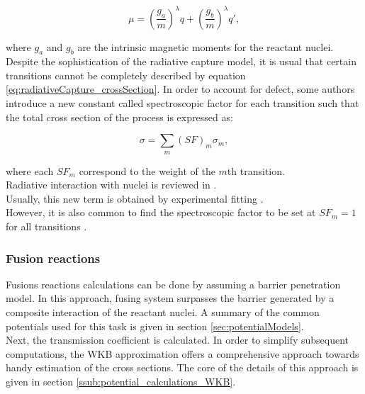 \documentclass[openany]{book}
\begin{document}
\begin{equation} \label{eq:radiativeCapture_Magnetic_moment}
	\mu =  \left(\frac{g_a}{m}\right)^{\lambda}q + \left(\frac{g_b}{m}\right)^{\lambda}q',
\end{equation}

where $g_a$ and $g_b$ are the intrinsic magnetic moments for the reactant nuclei. \\

Despite the sophistication of the radiative capture model, it is usual that certain transitions cannot be completely described by equation \ref{eq:radiativeCapture_crossSection}. In order to account for defect, some authors introduce a new constant called spectroscopic factor for each transition such that the total cross section of the process is expressed as: 

\begin{equation}  \label{eq:radiativeCapture_crossSection_SF}
	\sigma = \sum_{m}{{(SF)}_m\sigma_m},		
\end{equation}

where each ${SF}_m$ correspond to the weight of the $m$th transition. \\ 

Radiative interaction with nuclei is reviewed in \cite{blatt_weisskopf_1952}. \\

Usually, this new term is obtained by experimental fitting \cite{kabir_nabi_2021, xu_takahashi_goriely_arnould_ohta_utsunomiya_2013}. \\

However, it is also common to find the spectroscopic factor to be set at $SF_m = 1$ for all transitions \cite{bertulani_1996}. \\

\subsubsection{Fusion reactions} \label{ssub:potential_calculations_fusion}

Fusions reactions calculations can be done by assuming a barrier penetration model. In this approach, fusing system surpasses the barrier generated by a composite interaction of the reactant nuclei. A summary of the common potentials used for this task is given in section \ref{sec:potentialModels}. \\

Next, the transmission coefficient is calculated. In order to simplify subsequent computations, the WKB approximation offers a comprehensive approach towards handy estimation of the cross sections. The core of the details of this approach is given in section \ref{ssub:potential_calculations_WKB}. \\
\end{document}

